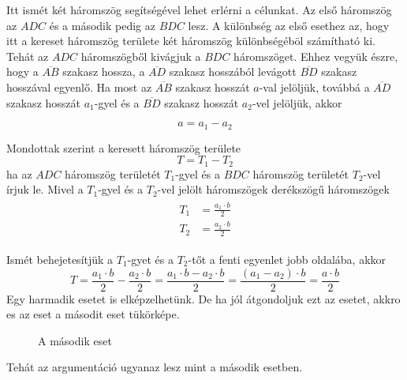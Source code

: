 \documentclass[11pt, a4paper]{article}
\begin{document}
Itt ism\'et k\'et h\'aromszög seg\'its\'eg\'evel lehet erl\'erni a c\'elunkat. Az els\H{o} h\'aromszög az $ADC$ \'es a m\'asodik pedig az $BDC$ lesz. A különbs\'eg az els\H{o} esethez az, hogy itt a kereset h\'aromszög területe k\'et h\'aromszög különbs\'eg\'eböl sz\'am\'ithat\'o ki. Teh\'at az $ADC$ h\'aromszögb\H{o}l kiv\'agjuk a $BDC$ h\'aromszöget. Ehhez vegyük \'eszre, hogy a $\overline{AB}$ szakasz hossza, a $\overline{AD}$ szakasz hossz\'ab\'ol lev\'agott $\overline{BD}$ szakasz hossz\'aval egyenl\H{o}. Ha most az $\overline{AB}$ szakasz hossz\'at $a$-val jelöljük, tov\'abb\'a a $\overline{AD}$ szakasz hossz\'at $a_1$-gyel \'es a $\overline{BD}$ szakasz hossz\'at $a_2$-vel jelöljük, akkor

\[
 a = a_1 - a_2
\]

Mondottak szerint a keresett h\'aromszög területe
\[
 T = T_1 - T_2
\]
ha az $ADC$ h\'aromszög terület\'et $T_1$-gyel \'es a $BDC$ h\'aromszög terület\'et $T_2$-vel \'irjuk le. Mivel a $T_1$-gyel \'es a $T_2$-vel jelölt h\'aromszögek der\'ekszög\H{u} h\'aromszögek
\begin{align}
 \begin{aligned}
     T_1 &= \frac{a_1\cdot b}{2} \\
     T_2 &= \frac{a_2\cdot b}{2}
 \end{aligned}
 \end{align}

Ism\'et behejetes\'itjük a $T_1$-gyet \'es a $T_2$-t\H{o}t a fenti egyenlet jobb oldal\'aba, akkor
 \[
     T = \frac{a_1\cdot b}{2} - \frac{a_2\cdot b}{2} = \frac{a_1\cdot b - a_2\cdot b}{2} = \frac{(a_1 - a_2) \cdot b}{2} = \frac{a\cdot b}{2}
 \]
\newpage
Egy harmadik esetet is elk\'epzelhetünk. De ha j\'ol \'atgondoljuk ezt az esetet, akkro es az eset a m\'asodit eset tükörk\'epe.

\begin{figure}[h]
\centering
{}
    \caption{A m\'asodik eset}
\label{fig:tri7}
\end{figure}

Teh\'at az argument\'aci\'o ugyanaz lesz mint a m\'asodik esetben.
\end{document}
